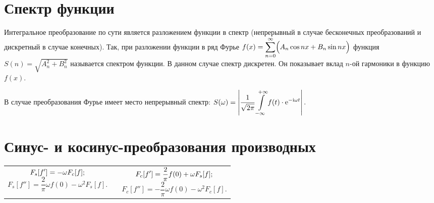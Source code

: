 \section{Спектр функции}
Интегральное преобразование по сути является разложением функции в спектр
(непрерывный в случае бесконечных преобразований и дискретный в случае
конечных). Так, при разложении функции в ряд Фурье
\( \displaystyle
   f(x) = \sum\limits_{n=0}^\infty \Bigl(A_n\cos nx + B_n\sin nx\Bigr)
\)
функция \( S(n) = \sqrt{A_n^2 + B_n^2} \) называется спектром функции. В данном
случае спектр дискретен. Он показывает вклад \( n \)-ой гармоники в функцию
\( f(x) \).

В случае преобразования Фурье имеет место непрерывный спектр:
\( \displaystyle
    S(\omega) = \left|\frac{1}{\sqrt{2\pi}}\int\limits_{-\infty}^{+\infty} f(t)
    \cdot\mathrm{e}^{-\mathrm{i}\omega t}\right|.
\)

\section{Синус- и косинус-преобразования производных}
\begin{table}[h!]
    \begin{tabular}{C{.47}cC{.47}}
        \( \displaystyle
            F_s[f'] = -\omega F_c[f];
        \)
        \[
            F_s[f''] = \frac{2}{\pi}\omega f(0) - \omega^2 F_s[f].
        \] & \hfill &
        \( \displaystyle
            F_c[f'] = \frac{2}{\pi}f(0) + \omega F_s[f];
        \)
        \[
            F_c[f''] = -\frac{2}{\pi}\omega f(0) - \omega^2 F_c[f].
        \] 
    \end{tabular}
\end{table}
\newpage
